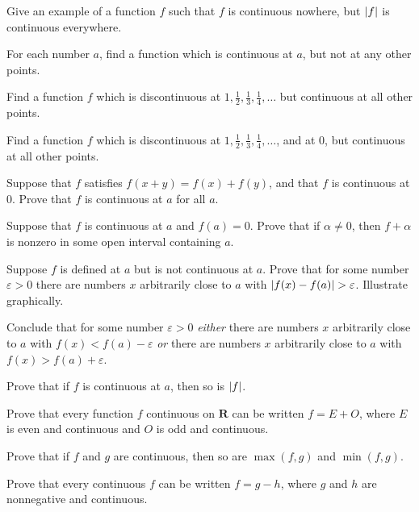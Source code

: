 Give an example of a function $f$ such that $f$ is continuous nowhere,
but $\lvert f\rvert$ is continuous everywhere.

For each number $a$, find a function which is continuous at $a$, but not
at any other points.

\begin{letters}
\item Find a function $f$ which is discontinuous at
  $1, \frac12, \frac13, \frac14, \dots$ but continuous at all other
  points.
\item Find a function $f$ which is discontinuous at
  $1, \frac12, \frac13, \frac14, \dots$, and at $0$, but continuous at
  all other points.
\end{letters}

Suppose that $f$ satisfies $f(x + y) = f(x) + f(y)$, and that $f$ is
continuous at $0$. Prove that $f$ is continuous at $a$ for all $a$.

Suppose that $f$ is continuous at $a$ and $f(a) = 0$. Prove that if
$\alpha \neq 0$, then $f + \alpha$ is nonzero in some open interval
containing $a$.

\begin{letters}
\item Suppose $f$ is defined at $a$ but is not continuous at $a$. Prove
  that for some number $\varepsilon > 0$ there are numbers $x$
  arbitrarily close to $a$ with $\lvert f(x) - f(a)\rvert > \varepsilon$.
  Illustrate graphically.
\item Conclude that for some number $\varepsilon > 0$ \emph{either}
  there are numbers $x$ arbitrarily close to $a$ with
  $f(x) < f(a) - \varepsilon$ \emph{or} there are numbers $x$
  arbitrarily close to $a$ with $f(x) > f(a) + \varepsilon$.
\end{letters}

\begin{letters}
\item Prove that if $f$ is continuous at $a$, then so is $\lvert f\rvert$.
\item Prove that every function $f$ continuous on $\mathbf{R}$ can be
  written $f = E + O$, where $E$ is even and continuous and $O$ is odd
  and continuous.
\item Prove that if $f$ and $g$ are continuous, then so are
  $\max(f,g)$ and $\min(f,g)$.
\item Prove that every continuous $f$ can be written $f = g - h$, where
  $g$ and $h$ are nonnegative and continuous.
\end{letters}

